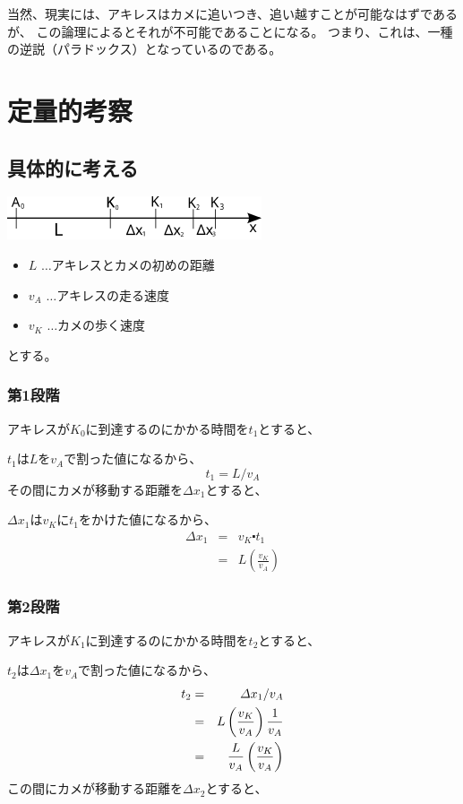 \documentclass[12pt,a4paper,fleqn]{ltjsarticle}
\begin{document}
当然、現実には、アキレスはカメに追いつき、追い越すことが可能なはずであるが、
この論理によるとそれが不可能であることになる。
つまり、これは、一種の逆説（パラドックス）となっているのである。

\newpage

\section{定量的考察}

\subsection{具体的に考える}

\includegraphics{AchillesDiff.png}

\begin{itemize}
  \item $L$ $\dots$アキレスとカメの初めの距離
  \item $v_A$ $\dots$アキレスの走る速度
  \item $v_K$ $\dots$カメの歩く速度
\end{itemize}
とする。

\subsubsection{第1段階}
アキレスが$K_0$に到達するのにかかる時間を$t_1$とすると、

$t_1$は$L$を$v_A$で割った値になるから、
\begin{displaymath}
  t_1 = L / v_A
\end{displaymath}
その間にカメが移動する距離を$\varDelta x_1$とすると、

$\varDelta x_1$は$v_K$に$t_1$をかけた値になるから、
\begin{eqnarray*}
  \varDelta x_1 &=& v_K \centerdot t_1 \\
                &=& L\left( \frac{v_K}{v_A} \right)
\end{eqnarray*}

\subsubsection{第2段階}
アキレスが$K_1$に到達するのにかかる時間を$t_2$とすると、

$t_2$は$\varDelta x_1$を$v_A$で割った値になるから、
\begin{eqnarray*}
  t_2 &=& \varDelta x_1 / v_A \notag \\
      &=& L\left( \frac{v_K}{v_A} \right)\frac{1}{v_A} \notag \\
      &=& \frac{L}{v_A}\left( \frac{v_K}{v_A} \right)
\end{eqnarray*}
この間にカメが移動する距離を$\varDelta x_2$とすると、
\end{document}

